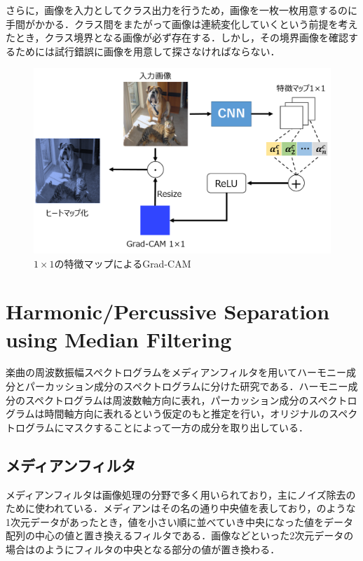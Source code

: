 さらに，画像を入力としてクラス出力を行うため，画像を一枚一枚用意するのに手間がかかる．クラス間をまたがって画像は連続変化していくという前提を考えたとき，クラス境界となる画像が必ず存在する．しかし，その境界画像を確認するためには試行錯誤に画像を用意して探さなければならない．

\begin{figure}[htbp]
	\begin{center}
		\includegraphics[scale=0.6]{./images/old-study/fail-gradcam.png}
		\caption{$1 \times 1$の特徴マップによるGrad-CAM}
	\end{center}
\end{figure}

\clearpage
\section{Harmonic/Percussive Separation using Median Filtering}
楽曲の周波数振幅スペクトログラムをメディアンフィルタを用いてハーモニー成分とパーカッション成分のスペクトログラムに分けた研究である\cite{percuss_harmony}．ハーモニー成分のスペクトログラムは周波数軸方向に表れ，パーカッション成分のスペクトログラムは時間軸方向に表れるという仮定のもと推定を行い，オリジナルのスペクトログラムにマスクすることによって一方の成分を取り出している．

\subsection{メディアンフィルタ}
メディアンフィルタは画像処理の分野で多く用いられており，主にノイズ除去のために使われている．メディアンはその名の通り中央値を表しており，のような1次元データがあったとき，値を小さい順に並べていき中央になった値をデータ配列の中心の値と置き換えるフィルタである．画像などといった2次元データの場合はのようにフィルタの中央となる部分の値が置き換わる．

